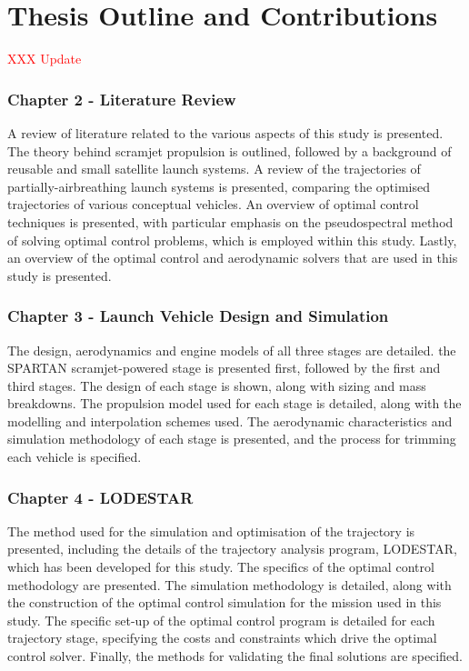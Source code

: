   \clearpage
  \section{Thesis Outline and Contributions}

    \textcolor{red}{XXX Update}

    \subsubsection*{Chapter 2 - Literature Review}

      A review of literature related to the various aspects of this study is presented. The theory behind scramjet propulsion is outlined, followed by a background of reusable and small satellite launch systems. A review of the trajectories of partially-airbreathing launch systems is presented, comparing the optimised trajectories of various conceptual vehicles. An overview of optimal control techniques is presented, with particular emphasis on the pseudospectral method of solving optimal control problems, which is employed within this study. Lastly, an overview of the optimal control and aerodynamic solvers that are used in this study is presented.
      

    \subsubsection*{Chapter 3 - Launch Vehicle Design and Simulation}

      The design, aerodynamics and engine models of all three stages are detailed. the SPARTAN scramjet-powered stage is presented first, followed by the first and third stages. The design of each stage is shown, along with sizing and mass breakdowns. The propulsion model used for each stage is detailed, along with the modelling and interpolation schemes used. The aerodynamic characteristics and simulation methodology of each stage is presented, and the process for trimming each vehicle is specified. 
      
      
      \subsubsection*{Chapter 4 - LODESTAR}
      
      The method used for the simulation and optimisation of the trajectory is presented, including the details of the trajectory analysis program, LODESTAR, which has been developed for this study. The specifics of the optimal control methodology are presented. The simulation methodology is detailed, along with the construction of the optimal control simulation for the mission used in this study. The specific set-up of the optimal control program is detailed for each trajectory stage, specifying the costs and constraints which drive the optimal control solver. Finally, the methods for validating the final solutions are specified.
      
